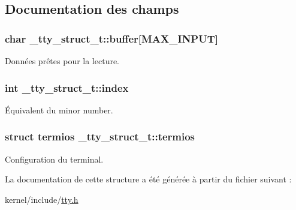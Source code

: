 \subsection{Documentation des champs}
\hypertarget{struct__tty__struct__t_ace735f0fca7a2e1c4c75f6ffb9223b19}{
\subsubsection[{buffer}]{\setlength{\rightskip}{0pt plus 5cm}char \-\_\-tty\-\_\-struct\-\_\-t\-::buffer\mbox{[}{\bf M\-A\-X\-\_\-\-I\-N\-P\-U\-T}\mbox{]}}}\label{struct__tty__struct__t_ace735f0fca7a2e1c4c75f6ffb9223b19}
Données prêtes pour la lecture. \hypertarget{struct__tty__struct__t_a4208e736cfcd8e0b00a3c0bbfe4674f7}{
\subsubsection[{index}]{\setlength{\rightskip}{0pt plus 5cm}int \-\_\-tty\-\_\-struct\-\_\-t\-::index}}\label{struct__tty__struct__t_a4208e736cfcd8e0b00a3c0bbfe4674f7}
Équivalent du minor number. \hypertarget{struct__tty__struct__t_a39471b82fd4e3a235744e73775ac2523}{
\subsubsection[{termios}]{\setlength{\rightskip}{0pt plus 5cm}struct {\bf termios} \-\_\-tty\-\_\-struct\-\_\-t\-::termios}}\label{struct__tty__struct__t_a39471b82fd4e3a235744e73775ac2523}
Configuration du terminal. 

La documentation de cette structure a été générée à partir du fichier suivant \-:\begin{DoxyCompactItemize}
\item 
kernel/include/\hyperlink{tty_8h}{tty.\-h}\end{DoxyCompactItemize}
